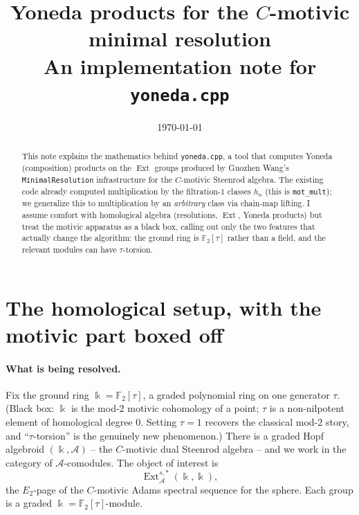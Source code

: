 \documentclass[11pt]{article}
\title{Yoneda products for the $C$-motivic minimal resolution\\
\large An implementation note for \texttt{yoneda.cpp}}
\author{}
\date{\today}
\newcommand{\Ext}{\operatorname{Ext}}
\newcommand{\A}{\mathcal{A}}
\newcommand{\F}{\mathbb{F}}
\newcommand{\kk}{\Bbbk}
\theoremstyle{definition}
\begin{document}
\maketitle

\begin{abstract}
This note explains the mathematics behind \texttt{yoneda.cpp}, a tool that computes
Yoneda (composition) products on the $\Ext$ groups produced by Guozhen Wang's
\texttt{MinimalResolution} infrastructure for the $C$-motivic Steenrod algebra.
The existing code already computed multiplication by the filtration-$1$ classes
$h_n$ (this is \texttt{mot\_mult}); we generalize this to multiplication by an
\emph{arbitrary} class via chain-map lifting. I assume comfort with homological
algebra (resolutions, $\Ext$, Yoneda products) but treat the motivic apparatus as
a black box, calling out only the two features that actually change the algorithm:
the ground ring is $\F_2[\tau]$ rather than a field, and the relevant modules can
have $\tau$-torsion.
\end{abstract}

\section{The homological setup, with the motivic part boxed off}

\paragraph{What is being resolved.}
Fix the ground ring $\kk=\F_2[\tau]$, a graded polynomial ring on one generator
$\tau$. (Black box: $\kk$ is the mod-$2$ motivic cohomology of a point; $\tau$ is a
non-nilpotent element of homological degree $0$. Setting $\tau=1$ recovers the
classical mod-$2$ story, and ``$\tau$-torsion'' is the genuinely new phenomenon.)
There is a graded Hopf algebroid $(\kk,\A)$ -- the $C$-motivic dual Steenrod
algebra -- and we work in the category of $\A$-comodules. The object of interest is
\[
  \Ext_{\A}^{s,*}(\kk,\kk),
\]
the $E_2$-page of the $C$-motivic Adams spectral sequence for the sphere. Each
group is a graded $\kk=\F_2[\tau]$-module.
\end{document}
